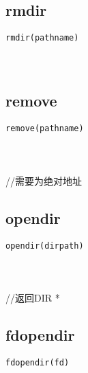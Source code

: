 \documentclass[10pt,a4paper]{article}
\begin{document}
\subsection{rmdir}
\begin{spacing}{2.0}
\lstset{language=C,numbers=none}
\begin{lstlisting}
rmdir(pathname)
\end{lstlisting}
{\large\color[rgb]{0.2,0.4,0.6}{pathname:}}
\paragraph{ \ \ }
\end{spacing}

\subsection{remove}
\begin{spacing}{2.0}
\lstset{language=C,numbers=none}
\begin{lstlisting}
remove(pathname)
\end{lstlisting}
{\large\color[rgb]{0.2,0.4,0.6}{pathname:}}
\paragraph{ \ \ }//需要为绝对地址
\end{spacing}

\subsection{opendir}
\begin{spacing}{2.0}
\lstset{language=C,numbers=none}
\begin{lstlisting}
opendir(dirpath)
\end{lstlisting}
{\large\color[rgb]{0.2,0.4,0.6}{dirpath:}}
\paragraph{ \ \ }//返回DIR *
\end{spacing}

\subsection{fdopendir}
\begin{spacing}{2.0}
\lstset{language=C,numbers=none}
\begin{lstlisting}
fdopendir(fd)
\end{lstlisting}
{\large\color[rgb]{0.2,0.4,0.6}{fd:}}
\paragraph{ \ \ }
\end{spacing}
\end{document}
